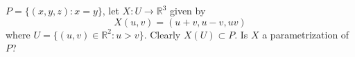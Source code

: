 
\begin{exercise}
    \(P=\{(x,y,z):x=y\}\), let \(X\colon U\to \mathbb{R}^3\) given by \[
        X(u,v)=(u+v,u-v,uv)
    \] where \(U=\{(u,v)\in \mathbb{R}^2:u>v\}\). Clearly \(X(U)\subset P\). Is
    \(X\) a parametrization of \(P\)?
\end{exercise}
